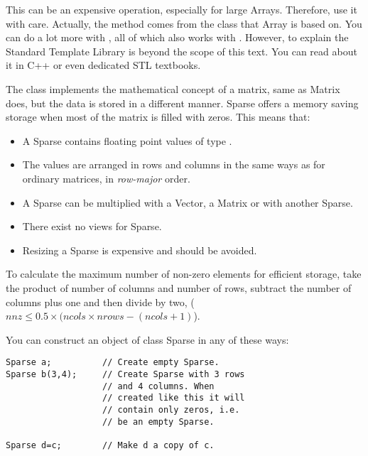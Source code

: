 This can be an expensive operation, especially for large Arrays.
Therefore, use it with care. Actually, the  method
comes from the  class that Array is based on. You
can do a lot more with , all of which also works
with . However, to explain the Standard Template Library
is beyond the scope of this text. You can read about it in C++ or even
dedicated STL textbooks.

\label{sec:matpack:sparse}

The class  implements the mathematical concept of a
matrix, same as Matrix does, but the data is stored in a
different manner. Sparse offers a memory saving storage when
most of the matrix is filled with zeros. This means that:
\begin{itemize}
\item A Sparse contains floating point values of type .
\item The values are arranged in rows and columns in the same ways as for
  ordinary matrices, in \emph{row-major} order.
\item A Sparse can be multiplied with a Vector, a Matrix or with another
  Sparse.
\item There exist no views for Sparse.
\item Resizing a Sparse is expensive and should be avoided.
\end{itemize}

To calculate the maximum number of non-zero elements for efficient storage,
take the product of number of columns and number of rows, subtract the
number of columns plus one and then divide by two,
\mbox{($nnz \leq 0.5\times (ncols\times nrows - (ncols+1)$).}

You can construct an object of class Sparse in any of these ways:

\begin{verbatim}
Sparse a;          // Create empty Sparse.
Sparse b(3,4);     // Create Sparse with 3 rows
                   // and 4 columns. When
                   // created like this it will
                   // contain only zeros, i.e.
                   // be an empty Sparse.

Sparse d=c;        // Make d a copy of c.
\end{verbatim}

